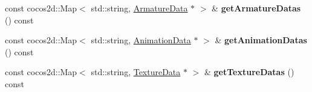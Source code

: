 \begin{DoxyCompactItemize}
const cocos2d\+::\+Map$<$ std\+::string, \hyperlink{classcocostudio_1_1ArmatureData}{Armature\+Data} $\ast$ $>$ \& {\bfseries get\+Armature\+Datas} () const
\item 
\mbox{\label{classcocostudio_1_1ArmatureDataManager_ad3f710fa178dfeddbaeee22661c6d146}} 
const cocos2d\+::\+Map$<$ std\+::string, \hyperlink{classcocostudio_1_1AnimationData}{Animation\+Data} $\ast$ $>$ \& {\bfseries get\+Animation\+Datas} () const
\item 
\mbox{\label{classcocostudio_1_1ArmatureDataManager_a34e9d9c01c2f054c4ab068320684c975}} 
const cocos2d\+::\+Map$<$ std\+::string, \hyperlink{classcocostudio_1_1TextureData}{Texture\+Data} $\ast$ $>$ \& {\bfseries get\+Texture\+Datas} () const
\end{DoxyCompactItemize}
